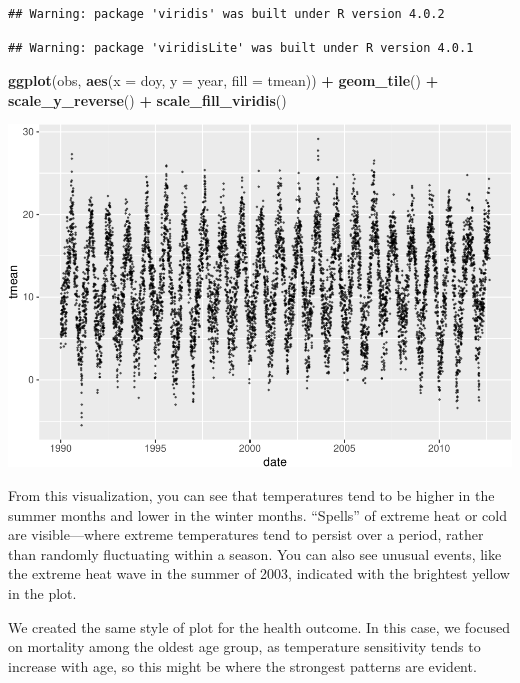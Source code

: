 \documentclass[
]{book}
\newenvironment{Shaded}{\begin{snugshade}}{\end{snugshade}}
\newcommand{\DataTypeTok}[1]{\textcolor[rgb]{0.13,0.29,0.53}{#1}}
\newcommand{\KeywordTok}[1]{\textcolor[rgb]{0.13,0.29,0.53}{\textbf{#1}}}
\newcommand{\NormalTok}[1]{#1}
\newcommand{\OperatorTok}[1]{\textcolor[rgb]{0.81,0.36,0.00}{\textbf{#1}}}
\newcommand{\StringTok}[1]{\textcolor[rgb]{0.31,0.60,0.02}{#1}}
\begin{document}
\begin{verbatim}
## Warning: package 'viridis' was built under R version 4.0.2
\end{verbatim}

\begin{verbatim}
## Warning: package 'viridisLite' was built under R version 4.0.1
\end{verbatim}

\begin{Shaded}
\begin{Highlighting}[]
\KeywordTok{ggplot}\NormalTok{(obs, }\KeywordTok{aes}\NormalTok{(}\DataTypeTok{x =}\NormalTok{ doy, }\DataTypeTok{y =}\NormalTok{ year, }\DataTypeTok{fill =}\NormalTok{ tmean)) }\OperatorTok{+}\StringTok{ }
\StringTok{  }\KeywordTok{geom_tile}\NormalTok{() }\OperatorTok{+}
\StringTok{  }\KeywordTok{scale_y_reverse}\NormalTok{() }\OperatorTok{+}\StringTok{ }
\StringTok{  }\KeywordTok{scale_fill_viridis}\NormalTok{()}
\end{Highlighting}
\end{Shaded}

\includegraphics{adv_epi_analysis_files/figure-latex/unnamed-chunk-10-1.pdf}

From this visualization, you can see that temperatures tend to be higher in the
summer months and lower in the winter months. ``Spells'' of extreme heat or cold
are visible---where extreme temperatures tend to persist over a period, rather
than randomly fluctuating within a season. You can also see unusual events, like
the extreme heat wave in the summer of 2003, indicated with the brightest
yellow in the plot.

We created the same style of plot for the health outcome. In this case, we
focused on mortality among the oldest age group, as temperature sensitivity
tends to increase with age, so this might be where the strongest patterns are
evident.
\end{document}

